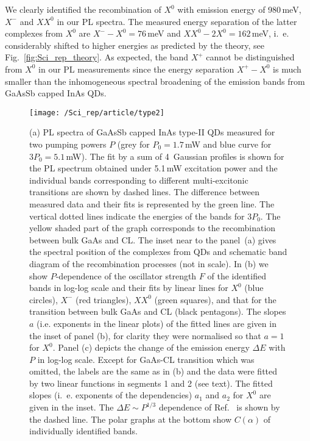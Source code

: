 We clearly identified the recombination of $X^0$ with emission energy of 980$\,$meV, $X^-$ and $XX^0$ in our PL spectra. The measured energy separation of the latter complexes from $X^0$ are $X^- - X^0=76$$\,$meV and $XX^0-2X^0=162$$\,$meV, i.~e. considerably shifted to higher energies as predicted by the theory, see Fig.~\ref{fig:Sci_rep_theory}. As expected, the band $X^+$ cannot be distinguished from $X^0$ in our PL measurements since the energy separation $X^+-X^0$ is much smaller than the inhomogeneous spectral broadening of the emission bands from GaAsSb capped InAs QDs.
%
\begin{figure}
	\centering
	\texttt{[image: /Sci\_rep/article/type2]}
	\caption{(a) PL spectra of GaAsSb capped InAs type-II QDs measured for two pumping powers $P$ (grey for $P_0=1.7$$\,$mW and blue curve for $3P_0=5.1$$\,$mW). The fit by a sum of 4~Gaussian profiles is shown for the PL spectrum obtained under 5.1$\,$mW excitation power and the individual bands corresponding to different multi-excitonic transitions are shown by dashed lines. The difference between measured data and their fits is represented by the green line. The vertical dotted lines indicate the energies of the bands for $3P_0$. The yellow shaded part of the graph corresponds to the recombination between bulk GaAs and CL. The inset near to the panel~(a) gives the spectral position of the complexes from QDs and schematic band diagram of the recombination processes (not in scale). In (b) we show $P$-dependence of the oscillator strength $F$ of the identified bands in log-log scale and their fits by linear lines for $X^0$ (blue circles), $X^-$ (red triangles), $XX^0$ (green squares), and that for the transition between bulk GaAs and CL (black pentagons). The slopes $a$ (i.e. exponents in the linear plots) of the fitted lines are given in the inset of panel (b), for clarity they were normalised so that $a=1$ for $X^0$. Panel (c) depicts the change of the emission energy $\Delta E$ with $P$ in log-log scale. Except for GaAs-CL transition which was omitted, the labels are the same as in (b) and the data were fitted by two linear functions in segments 1 and 2 (see text). The fitted slopes (i.~e. exponents of the dependencies) $a_1$ and $a_2$ for $X^0$ are given in the inset. The $\Delta E\sim P^{1/3}$ dependence of Ref.~\citep{Hatami1998} is shown by the dashed line. The polar graphs at the bottom show $C(\alpha)$ of individually identified bands.}
	\label{fig:sci_rep_typeII}
\end{figure}

